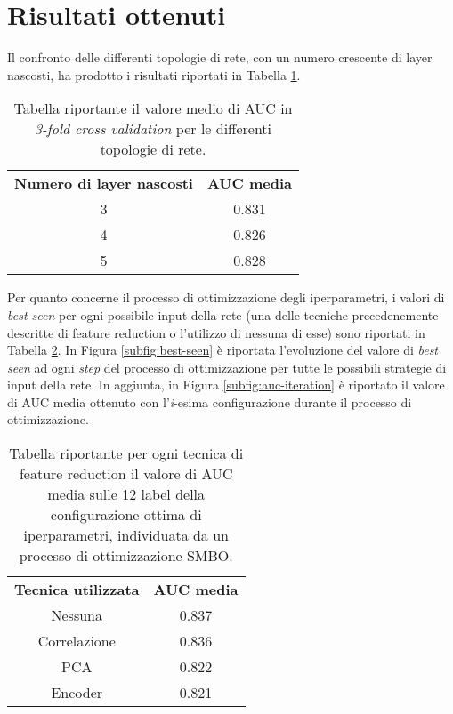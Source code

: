 \section{Risultati ottenuti}
Il confronto delle differenti topologie di rete, con un numero crescente di layer nascosti, ha prodotto i risultati riportati in Tabella \ref{tab:topology}.
\begin{table}
	\centering
	\caption{Tabella riportante il valore medio di AUC in \textit{3-fold cross validation} per le differenti topologie di rete.}
	\begin{tabular}{c|c}
		\label{tab:topology}
		\textbf{Numero di layer nascosti} & \textbf{AUC media} \\
		3 & 0.831 \\ 
		4 & 0.826 \\ 
		5 & 0.828 \\
	\end{tabular}
\end{table}

Per quanto concerne il processo di ottimizzazione degli iperparametri, i valori di \textit{best seen} per ogni possibile input della rete (una delle tecniche precedenemente descritte di feature reduction o l'utilizzo di nessuna di esse) sono riportati in Tabella \ref{tab:bestseen}. 
In Figura \ref{subfig:best-seen} è riportata l'evoluzione del valore di \textit{best seen} ad ogni \textit{step} del processo di ottimizzazione per tutte le possibili strategie di input della rete.
In aggiunta, in Figura \ref{subfig:auc-iteration} è riportato il valore di AUC media ottenuto con l'\textit{i}-esima configurazione durante il processo di ottimizzazione.
\begin{table}
	\centering
	\caption{Tabella riportante per ogni tecnica di feature reduction il valore di AUC media sulle 12 label della configurazione ottima di iperparametri, individuata da un processo di ottimizzazione SMBO.}
	\begin{tabular}{c|c}
		\label{tab:bestseen}
		\textbf{Tecnica utilizzata} & \textbf{AUC media} \\
		Nessuna & 0.837 \\ 
		Correlazione & 0.836 \\ 
		PCA & 0.822 \\ 
		Encoder & 0.821 \\ 
	\end{tabular}
\end{table}

